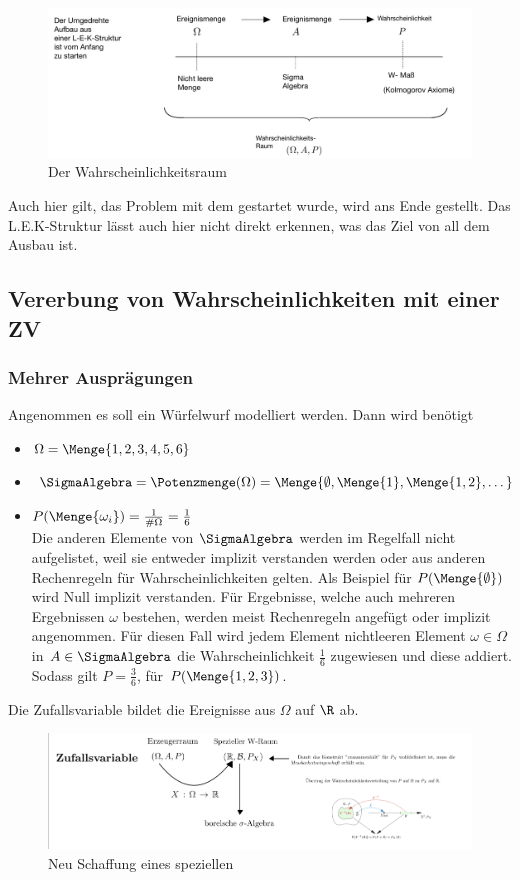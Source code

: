 \begin{figure}[H]
	\centering
	\includegraphics[width=0.7\linewidth]{attachment/chapter_13/Scc067}
	\caption{Der Wahrscheinlichkeitsraum}
\end{figure}

Auch hier gilt, das Problem mit dem gestartet wurde, wird ans Ende gestellt. Das L.E.K-Struktur lässt auch hier nicht direkt erkennen, was das Ziel von all dem Ausbau ist.

\subsection{Vererbung von Wahrscheinlichkeiten mit einer ZV}
\subsubsection{Mehrer Ausprägungen}
Angenommen es soll ein Würfelwurf modelliert werden. Dann wird benötigt
\begin{itemize}
	\item $\Omega = \Menge{1,2,3,4,5,6}$
	\item $\SigmaAlgebra = \Potenzmenge (\Omega) = \Menge{\emptyset,\Menge{1}, \Menge{1,2}, \dots}$
	\item $P(\Menge{\omega_i}) = \frac{1}{\#\Omega} = \frac{1}{6}$ \\
	Die anderen Elemente von $\SigmaAlgebra$ werden im Regelfall nicht aufgelistet, weil sie entweder implizit verstanden werden oder aus anderen Rechenregeln für Wahrscheinlichkeiten gelten. Als Beispiel für $P(\Menge{\emptyset})$ wird Null implizit verstanden. Für Ergebnisse, welche auch mehreren Ergebnissen $\omega$ bestehen, werden meist Rechenregeln angefügt oder implizit angenommen. Für diesen Fall wird jedem Element nichtleeren Element $\omega\in \Omega$ in $A\in \SigmaAlgebra$ die Wahrscheinlichkeit $\frac{1}{6}$ zugewiesen und diese addiert. Sodass gilt $P=\frac{3}{6}$, für $P(\Menge{1,2,3})$.
\end{itemize}

Die Zufallsvariable bildet die Ereignisse aus $\Omega$ auf $\R$ ab.

\begin{figure}[H]
	\centering
	\includegraphics[width=0.7\linewidth]{attachment/chapter_13/Scc068}
	\caption{Neu Schaffung eines speziellen \WRaum}
\end{figure}

